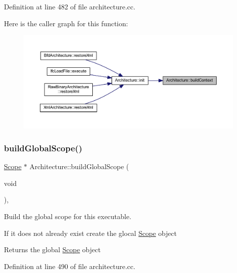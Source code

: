 Definition at line 482 of file architecture.\+cc.

Here is the caller graph for this function\+:
\nopagebreak
\begin{figure}[H]
\begin{center}
\leavevmode
\includegraphics[width=350pt]{class_architecture_a9a2fd38d4d08155637ebee1e043fd9a8_icgraph}
\end{center}
\end{figure}
\mbox{\label{class_architecture_afa2d6a96b669efefe4b89915aa8a65f7}} 
\subsubsection{\texorpdfstring{buildGlobalScope()}{buildGlobalScope()}}
{\footnotesize\ttfamily \mbox{\hyperlink{class_scope}{Scope}} $\ast$ Architecture\+::build\+Global\+Scope (\begin{DoxyParamCaption}\item[{void}]{ }\end{DoxyParamCaption})\hspace{0.3cm}{\ttfamily [protected]}, {\ttfamily [virtual]}}



Build the global scope for this executable. 

If it does not already exist create the glocal \mbox{\hyperlink{class_scope}{Scope}} object \begin{DoxyReturn}{Returns}
the global \mbox{\hyperlink{class_scope}{Scope}} object 
\end{DoxyReturn}


Definition at line 490 of file architecture.\+cc.

